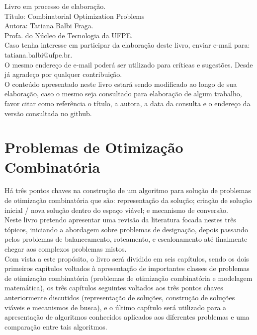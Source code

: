 \documentclass{book}
\begin{document}
Livro em processo de elaboração. \\

Título: Combinatorial Optimization Problems\\

Autora: Tatiana Balbi Fraga. \\

Profa. do Núcleo de Tecnologia da UFPE. \\

Caso tenha interesse em participar da elaboração deste livro, enviar e-mail para: tatiana.balbi@ufpe.br.\\

O mesmo endereço de e-mail poderá ser utilizado para críticas e sugestões. Desde já agradeço por qualquer contribuição. \\

O conteúdo apresentado neste livro estará sendo modificado ao longo de sua elaboração, caso o mesmo seja consultado para elaboração de algum trabalho, favor citar como referência o título, a autora, a data da consulta e o endereço da versão consultada no github. \\

\chapter{Problemas de Otimização Combinatória}

Há três pontos chaves na construção de um algoritmo para solução de problemas de otimização combinatória que são: representação da solução; criação de solução inicial / nova solução dentro do espaço viável; e mecanismo de conversão. \\

Neste livro pretendo apresentar uma revisão da literatura focada nestes três tópicos, iniciando a abordagem sobre problemas de designação, depois passando pelos problemas de balanceamento, roteamento, e escalonamento até finalmente chegar aos complexos problemas mistos. \\

Com vista a este propósito, o livro será dividido em seis capítulos, sendo os dois primeiros capítulos voltados à apresentação de importantes classes de problemas de otimização combinatória (problemas de otimização combinatória e modelagem matemática), os três capítulos seguintes voltados aos três pontos chaves anteriormente discutidos (representação de soluções, construção de soluções viáveis e mecanismos de busca), e o último capítulo será utilizado para a apresentação de algoritmos conhecidos aplicados aos diferentes problemas e uma comparação entre tais algoritmos. \\
\end{document}
